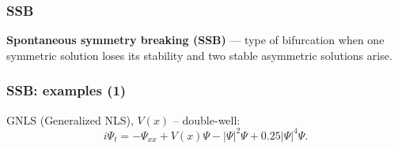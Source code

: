 \documentclass{beamer}
\begin{document}
\begin{frame}
\frametitle{SSB}

{\bf Spontaneous symmetry breaking (SSB)} --- type of bifurcation when one symmetric solution loses its stability and two stable asymmetric solutions arise.

\begin{figure}
\label{pic:ssb_scheme}
\end{figure}

\end{frame}


\begin{frame}
\frametitle{SSB: examples (1)}

GNLS (Generalized NLS), $V(x)$ -- double-well\footnotemark[3]:
$$i \Psi_t = -\Psi_{xx} + V(x) \Psi - |\Psi|^2 \Psi + 0.25 |\Psi|^4 \Psi.$$

\begin{figure}
\label{pic:ssb_ex1}
\end{figure}

\end{frame}
\end{document}
